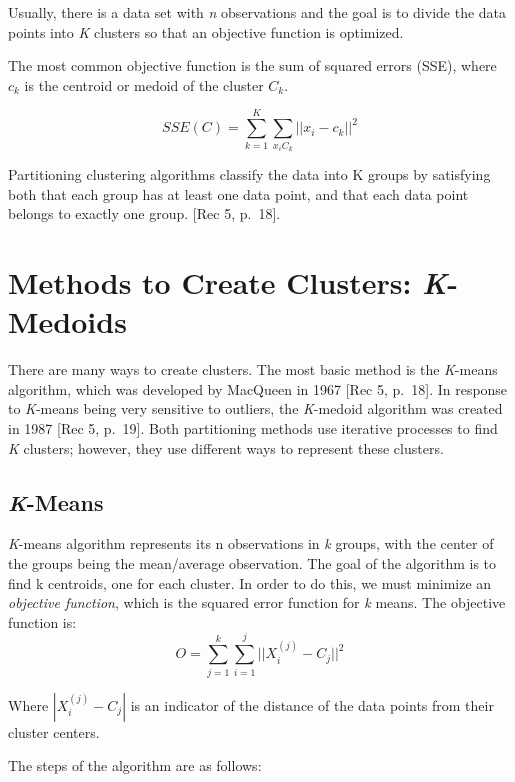 \documentclass[12pt,twoside]{amherstthesis}
\begin{document}
  Usually, there is a data set with \emph{n} observations and the goal is
  to divide the data points into \emph{K} clusters so that an objective
  function is optimized.
  
  The most common objective function is the sum of squared errors (SSE),
  where \(c_k\) is the centroid or medoid of the cluster \(C_k\).
  
  \[SSE(C)= \sum_{k=1}^K \sum_{x_{i}C_{k}} ||{x_i}- c_k||^2\]
  
  Partitioning clustering algorithms classify the data into K groups by
  satisfying both that each group has at least one data point, and that
  each data point belongs to exactly one group. {[}Rec 5, p.~18{]}.
  
  \section{\texorpdfstring{Methods to Create Clusters:
  \emph{K}-Medoids}{Methods to Create Clusters: K-Medoids}}\label{methods-to-create-clusters-k-medoids}
  
  There are many ways to create clusters. The most basic method is the
  \emph{K}-means algorithm, which was developed by MacQueen in 1967 {[}Rec
  5, p.~18{]}. In response to \emph{K}-means being very sensitive to
  outliers, the \emph{K}-medoid algorithm was created in 1987 {[}Rec 5,
  p.~19{]}. Both partitioning methods use iterative processes to find
  \emph{K} clusters; however, they use different ways to represent these
  clusters.
  
  \subsection{\texorpdfstring{\emph{K}-Means}{K-Means}}\label{k-means}
  
  \emph{K}-means algorithm represents its n observations in \emph{k}
  groups, with the center of the groups being the mean/average
  observation. The goal of the algorithm is to find k centroids, one for
  each cluster. In order to do this, we must minimize an \emph{objective
  function}, which is the squared error function for \emph{k} means. The
  objective function is:
  \[O= \sum_{j=1}^k \sum_{i=1}^j ||{{X_i^{(j)}- C_j}}||^2\]
  
  Where \(|{{X_i^{(j)}- C_j}}|\) is an indicator of the distance of the
  data points from their cluster centers.
  
  The steps of the algorithm are as follows:
  
\end{document}

